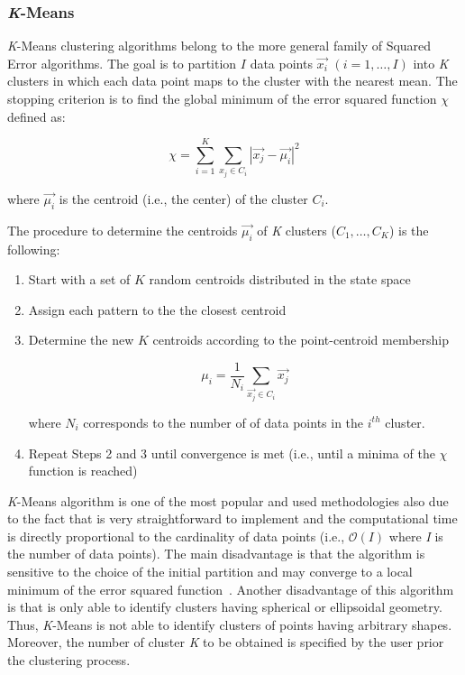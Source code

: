 \subsubsection{\emph{K}-Means}
\label{KMeans}

\emph{K}-Means clustering algorithms belong to the more general family of Squared Error algorithms. The goal is to partition $I$ data points $\vec{x_{i}}$ $(i=1,\ldots,I)$ into \emph{K} clusters in which each data point maps to the cluster with the nearest mean. The stopping criterion is to find the global minimum of the error squared function $\chi$ defined as:

\begin{equation}
    \chi = \displaystyle \sum_{i=1}^K \displaystyle \sum_{x_{j}\in C_{i}} |\vec{x_{j}}-\vec{\mu_{i}}|^{2}
\end{equation}

where $\vec{\mu_{i}}$ is the centroid (i.e., the center) of the cluster $C_{i}$.

The procedure to determine the centroids $\vec{\mu_{i}}$ of \emph{K} clusters (${C_{1},\ldots,C_{K}}$) is the following:

\begin{enumerate}
  \item Start with a set of $K$ random centroids distributed in the state space
  \item Assign each pattern to the the closest centroid
  \item Determine the new $K$ centroids according to the point-centroid membership

    \begin{equation}
        \mu_{i} = \displaystyle \frac{1}{N_{i}} \sum_{\vec{x_{j}}\in C_{i}} \vec{x_{j}}
    \end{equation}

    where $N_{i}$ corresponds to the number of of data points in the $i^{th}$ cluster.

  \item Repeat Steps 2 and 3 until convergence is met (i.e., until a minima of the $\chi$ function is reached)
\end{enumerate}

\emph{K}-Means algorithm is one of the most popular and used methodologies also due to the fact that is very straightforward to implement and the computational time is directly proportional to the cardinality of data points (i.e., $\mathcal{O}(I)$ where \emph{I} is the number of data points). The main disadvantage is that the algorithm is sensitive to the choice of the initial partition and may converge to a local minimum of the error squared function~\cite{JainAlgor88}. Another disadvantage of this algorithm is that is only able to identify clusters having spherical or ellipsoidal geometry. Thus, \emph{K}-Means is not able to identify clusters of points having arbitrary shapes. Moreover, the number of cluster \emph{K} to be obtained is specified by the user prior the clustering process.

